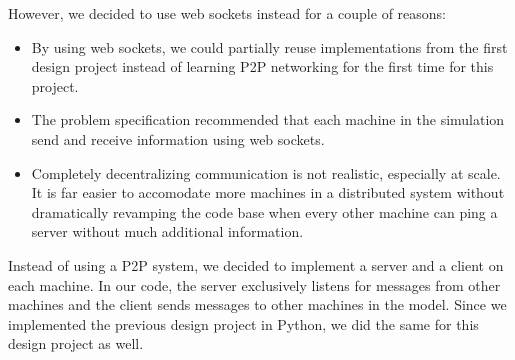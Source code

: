 \documentclass[
	a4paper, %
	10pt, %
	unnumberedsections, %
	twoside, %
]{LTJournalArticle}
\begin{document}
However, we decided to use web sockets instead for a couple of reasons: 
\begin{itemize}
    \item By using web sockets, we could partially reuse implementations from the first design project instead of learning P2P networking for the first time for this project. 
    \item The problem specification recommended that each machine in the simulation send and receive information using web sockets. 
    \item Completely decentralizing communication is not realistic, especially at scale. It is far easier to accomodate more machines in a distributed system without dramatically revamping the code base when every other machine can ping a server without much additional information. 
\end{itemize}

Instead of using a P2P system, we decided to implement a server and a client on each machine. In our code, the server exclusively listens for messages from other machines and the client sends messages to other machines in the model. Since we implemented the previous design project in Python, we did the same for this design project as well. 




\end{document}
